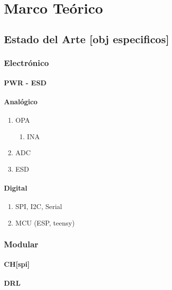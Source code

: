 \chapter{Marco Te\'orico}
\section{Estado del Arte [obj especificos]}
\label{sec:orga4155bd}


\subsection{Electrónico}
\label{sec:org3c24c2c}
\subsubsection{PWR - ESD}
\label{sec:org9483634}
\subsubsection{Analógico}
\label{sec:orgfffc89f}
\begin{enumerate}
\item OPA
\label{sec:org5642dad}
\begin{enumerate}
\item INA
\label{sec:orgc19bf3a}
\end{enumerate}
\item ADC
\label{sec:org4144647}
\item ESD
\label{sec:org1055d47}
\end{enumerate}
\subsubsection{Digital}
\label{sec:org7569d82}
\begin{enumerate}
\item SPI, I2C, Serial
\label{sec:orgbdc6479}
\item MCU (ESP, teensy)
\label{sec:org495d4dd}
\end{enumerate}
\subsection{Modular}
\label{sec:orgbf0af0d}
\subsubsection{CH[spi]}
\label{sec:orgbdc7568}
\subsubsection{DRL}
\label{sec:orge76d276}
